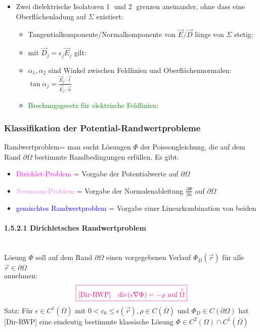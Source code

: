 \documentclass[]{article}
\begin{document}
\begin{itemize}
\newpage
		
		\item 
			Zwei dielektrische Isolatoren \textcircled{1} und \textcircled{2} grenzen aneinander, ohne dass eine Oberflächenladung auf $\Sigma$ existiert:
			\begin{itemize}
			\item 
				Tangentialkomponente/Normalkomponente von $\vec{E}/\vec{D}$ längs von $\Sigma$ stetig: \\
			\item 
				mit $\vec{D}_j=\epsilon_j\vec{E}_j$ gilt: 
			\item 
				$\alpha_1, \alpha_2$ sind Winkel zwischen Feldlinien und Oberflächennormalen: $\tan \alpha_j=\frac{\vec{E}_j\cdot \vec{t}}{\vec{E}_j\cdot \vec{n}}$ 
			\item 
				\textcolor{green}{Brechungsgesetz für elektrische Feldlinien: }
		\end{itemize}
	\end{itemize}

\newpage

\subsubsection{Klassifikation der Potential-Randwertprobleme}
	Randwertproblem= man sucht Lösungen $\Phi$ der Poissongleichung, die auf dem Rand $∂\Omega$ bestimmte Randbedingungen erfüllen. 
	Es gibt:
	
	\begin{itemize}
		\item 
			\textcolor{magenta}{Dirichlet-Problem} = Vorgabe der Potentialwerte auf $∂\Omega$
		\item 
			\textcolor{violet}{Neumann-Problem} = Vorgabe der Normalenableitung $\frac{∂\Phi}{∂n}$ auf $∂\Omega$
		\item 
			\textcolor{blue}{gemischtes Randwertproblem} = Vorgabe einer Linearkombination von beiden
	\end{itemize}
	
\paragraph{1.5.2.1 Dirichletsches Randwertproblem}
	\ \\Lösung $\Phi$ soll auf dem Rand $∂\Omega$ einen vorgegebenen Verlauf $\Phi_D(\vec{r})$ für alle $\vec{r}\in ∂\Omega$ 
	\\ annehmen: 
	$$
		\textcolor{magenta}{\fbox{[Dir-RWP]\quad div$(\epsilon \nabla \Phi)=-\rho \ \text{auf}\  \overset{\circ}{\Omega}$}}
	$$
	Satz: Für $\epsilon\in C^1(\overline{\Omega})$ mit $0 < c_0 \leq \epsilon(\vec{r}), \rho \in C(\overline{\Omega})$ und $\Phi_D\in C(∂\Omega)$ hat  [Dir-RWP] eine eindeutig bestimmte klassische Lösung $\Phi \in C^2(\Omega)\cap C^1(\overline{\Omega})$
\end{document}
